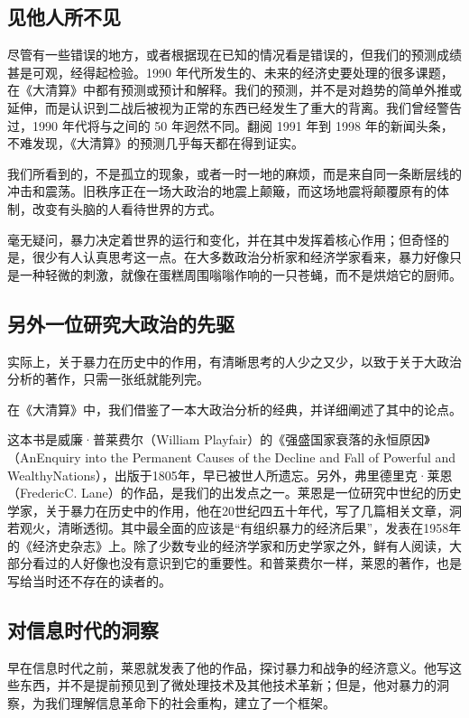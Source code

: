 \subsection{见他人所不见}
尽管有一些错误的地方，或者根据现在已知的情况看是错误的，但我们的预测成绩甚是可观，经得起检验。1990 年代所发生的、未来的经济史要处理的很多课题，在《大清算》中都有预测或预计和解释。我们的预测，并不是对趋势的简单外推或延伸，而是认识到二战后被视为正常的东西已经发生了重大的背离。我们曾经警告过，1990 年代将与之间的 50 年迥然不同。翻阅 1991 年到 1998 年的新闻头条，不难发现，《大清算》的预测几乎每天都在得到证实。

我们所看到的，不是孤立的现象，或者一时一地的麻烦，而是来自同一条断层线的冲击和震荡。旧秩序正在一场大政治的地震上颠簸，而这场地震将颠覆原有的体制，改变有头脑的人看待世界的方式。

毫无疑问，暴力决定着世界的运行和变化，并在其中发挥着核心作用；但奇怪的是，很少有人认真思考这一点。在大多数政治分析家和经济学家看来，暴力好像只是一种轻微的刺激，就像在蛋糕周围嗡嗡作响的一只苍蝇，而不是烘焙它的厨师。


\subsection{另外一位研究大政治的先驱}
实际上，关于暴力在历史中的作用，有清晰思考的人少之又少，以致于关于大政治分析的著作，只需一张纸就能列完。


在《大清算》中，我们借鉴了一本大政治分析的经典，并详细阐述了其中的论点。


这本书是威廉·普莱费尔（William Playfair）的《强盛国家衰落的永恒原因》（AnEnquiry into the Permanent Causes of the Decline and Fall of Powerful and WealthyNations），出版于1805年，早已被世人所遗忘。另外，弗里德里克·莱恩（FredericC. Lane）的作品，是我们的出发点之一。莱恩是一位研究中世纪的历史学家，关于暴力在历史中的作用，他在20世纪四五十年代，写了几篇相关文章，洞若观火，清晰透彻。其中最全面的应该是“有组织暴力的经济后果”，发表在1958年的《经济史杂志》上。除了少数专业的经济学家和历史学家之外，鲜有人阅读，大部分看过的人好像也没有意识到它的重要性。和普莱费尔一样，莱恩的著作，也是写给当时还不存在的读者的。


\subsection{对信息时代的洞察}
早在信息时代之前，莱恩就发表了他的作品，探讨暴力和战争的经济意义。他写这些东西，并不是提前预见到了微处理技术及其他技术革新；但是，他对暴力的洞察，为我们理解信息革命下的社会重构，建立了一个框架。


